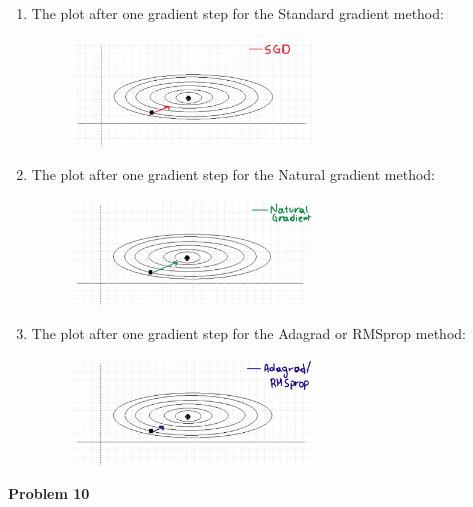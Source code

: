 \documentclass{article}
\begin{document}
\begin{enumerate}
  \item The plot after one gradient step for the Standard gradient method:
        \begin{figure}[h]
          \centering
          \includegraphics[width=0.6\textwidth]{pr9_a.png}
          
        \end{figure}
        
  \item The plot after one gradient step for the Natural gradient method:
        \begin{figure}[h]
          \centering
          \includegraphics[width=0.6\textwidth]{pr9_b.png}
          
        \end{figure}
  \item The plot after one gradient step for the Adagrad or RMSprop method:
        \begin{figure}[h]
          \centering
          \includegraphics[width=0.6\textwidth]{pr9_c.png}
          
        \end{figure}
\end{enumerate}




\newpage
\noindent \textbf{Problem 10} \\
\end{document}
